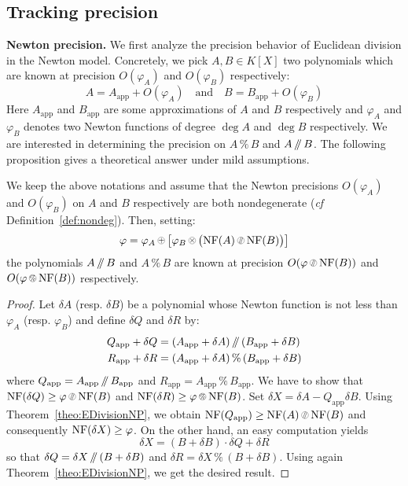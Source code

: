 \documentclass{sig-alternate-05-2015}
\newcommand{\NF}{\text{\rm NF}}
\renewcommand{\mod}{\,\%\,}
\renewcommand{\div}{\,/\hspace{-0.3em}/\,}
\newcommand{\nfop}[1]{%
\raisebox{-0.1mm}{\begin{tikzpicture}
\draw[transparent] (-0.18,0)--(0.18,0);
\draw[very thin] (0,0) circle (0.11cm);
\begin{scope}
\clip (0,0) circle (0.11cm);
\node[scale=0.75] at (0,0) { $#1$ };
\end{scope}
\end{tikzpicture}}}
\newcommand{\nfplus}{\nfop+}
\newcommand{\nftimes}{\nfop\times}
\newcommand{\nfmod}{\nfop\mod}
\newcommand{\nfdiv}{\nfop\div}
\newcommand{\app}{\textrm{app}}
\begin{document}
\subsection{Tracking precision} \label{sec:prec_track}

\medskip

\noindent
{\bf Newton precision.}
We first analyze the precision behavior of Euclidean division
in the Newton model.  Concretely, we pick $A, B \in K[X]$ two polynomials which 
are known at precision $O(\varphi_A)$ and $O(\varphi_B)$ respectively:
$$A = A_\app + O(\varphi_A)
\quad \text{and} \quad
B = B_\app + O(\varphi_B)$$
Here $A_\app$ and $B_\app$ are some approximations of $A$ and $B$ respectively 
and $\varphi_A$ and $\varphi_B$ denotes two Newton functions of degree 
$\deg A$ and $\deg B$ respectively.
We are interested in determining the precision on $A \mod B$ and $A
\div B$. The following proposition gives a theoretical answer under
mild assumptions.

\begin{prop}
\label{prop:NewtonprecEuclide}
We keep the above notations and assume that the Newton precisions
$O(\varphi_A)$ and $O(\varphi_B)$ on $A$ and $B$ respectively are 
both nondegenerate (\emph{cf} Definition~\ref{def:nondeg}). Then,
setting:
$$\varphi = \varphi_A \nfplus 
\big[ \varphi_B \nftimes \big(\NF(A) \nfdiv \NF(B)\big) \big]$$
the polynomials $A \div B$ and $A \mod B$ are known at precision 
$O(\varphi \nfdiv \NF(B))$ and $O(\varphi \nfmod \NF(B))$ respectively.
\end{prop}

\begin{proof}
Let $\delta A$ (resp. $\delta B$) be a polynomial whose Newton 
function is not less than $\varphi_A$ (resp. $\varphi_B$) and define
$\delta Q$ and $\delta R$ by:
\begin{align*}
Q_\app + \delta Q & = (A_\app + \delta A) \div (B_\app + \delta B) \\
R_\app + \delta R & = (A_\app + \delta A) \mod (B_\app + \delta B)
\end{align*}
where $Q_\app = A_\app \div B_\app$ and $R_\app = A_\app \mod B_\app$.
We have to show that $\NF(\delta Q) \geq \varphi \nfdiv \NF(B)$ and
$\NF(\delta R) \geq \varphi \nfmod \NF(B)$.
Set $\delta X = \delta A - Q_\app \delta B$. 
Using Theorem~\ref{theo:EDivisionNP}, we obtain $\NF(Q_\app) \geq
\NF(A) \nfdiv \NF(B)$ and consequently $\NF(\delta X) \geq \varphi$.
On the other hand, an easy computation yields
$$\delta X = (B + \delta B) \cdot \delta Q + \delta R$$
so that $\delta Q = \delta X \div (B + \delta B)$ and 
$\delta R = \delta X \mod (B + \delta B)$. Using again 
Theorem~\ref{theo:EDivisionNP}, we get the desired result.
\end{proof}
\end{document}
